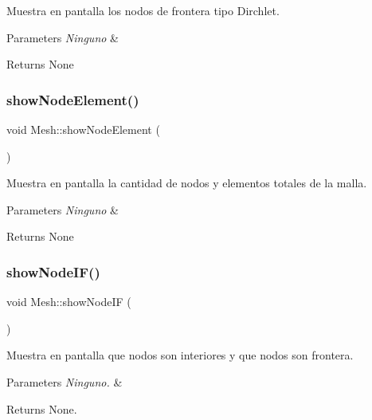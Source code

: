 Muestra en pantalla los nodos de frontera tipo Dirchlet. 


\begin{DoxyParams}{Parameters}
{\em Ninguno} & \\
\hline
\end{DoxyParams}
\begin{DoxyReturn}{Returns}
None 
\end{DoxyReturn}
\hypertarget{class_mesh_ac8d60f17c950dca8ef1a6288860bd3cb}{}\label{class_mesh_ac8d60f17c950dca8ef1a6288860bd3cb} 
\subsubsection{\texorpdfstring{show\+Node\+Element()}{showNodeElement()}}
{\footnotesize\ttfamily void Mesh\+::show\+Node\+Element (\begin{DoxyParamCaption}{ }\end{DoxyParamCaption})}



Muestra en pantalla la cantidad de nodos y elementos totales de la malla. 


\begin{DoxyParams}{Parameters}
{\em Ninguno} & \\
\hline
\end{DoxyParams}
\begin{DoxyReturn}{Returns}
None 
\end{DoxyReturn}
\hypertarget{class_mesh_a4de5c225341eb4fc73810d1415eb57da}{}\label{class_mesh_a4de5c225341eb4fc73810d1415eb57da} 
\subsubsection{\texorpdfstring{show\+Node\+I\+F()}{showNodeIF()}}
{\footnotesize\ttfamily void Mesh\+::show\+Node\+IF (\begin{DoxyParamCaption}{ }\end{DoxyParamCaption})}



Muestra en pantalla que nodos son interiores y que nodos son frontera. 


\begin{DoxyParams}{Parameters}
{\em Ninguno.} & \\
\hline
\end{DoxyParams}
\begin{DoxyReturn}{Returns}
None. 
\end{DoxyReturn}
\hypertarget{class_mesh_a0a4f5148e80cc4a1df6db20e149515a2}{}\label{class_mesh_a0a4f5148e80cc4a1df6db20e149515a2} 
